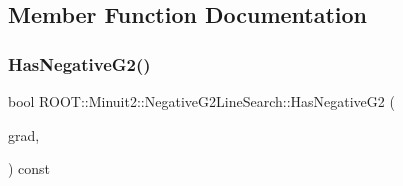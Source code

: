 \subsection{Member Function Documentation}
\mbox{\label{classROOT_1_1Minuit2_1_1NegativeG2LineSearch_a5450b0e5a0144e9c3e6028e8ae4a2c76}} 
\subsubsection{\texorpdfstring{HasNegativeG2()}{HasNegativeG2()}\hspace{0.1cm}{\footnotesize\ttfamily [1/2]}}
{\footnotesize\ttfamily bool R\+O\+O\+T\+::\+Minuit2\+::\+Negative\+G2\+Line\+Search\+::\+Has\+Negative\+G2 (\begin{DoxyParamCaption}\item[{const \mbox{\hyperlink{classROOT_1_1Minuit2_1_1FunctionGradient}{Function\+Gradient}} \&}]{grad,  }\item[{const \mbox{\hyperlink{classROOT_1_1Minuit2_1_1MnMachinePrecision}{Mn\+Machine\+Precision}} \&}]{ }\end{DoxyParamCaption}) const}

